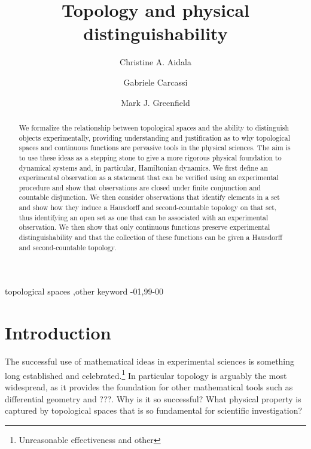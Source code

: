 \documentclass[review]{elsarticle}
\theoremstyle{plain}%
\theoremstyle{definition}
\theoremstyle{remark}
\begin{document}
\begin{frontmatter}

\title{Topology and physical distinguishability}

\author[]{Christine A. Aidala}

\author[]{Gabriele Carcassi}

\author[]{Mark J. Greenfield}

\address{University of Michigan, Ann Arbor, MI 48109, USA}



\begin{abstract}
We formalize the relationship between topological spaces and the ability to distinguish objects experimentally, providing understanding and justification as to why topological spaces and continuous functions are pervasive tools in the physical sciences. The aim is to use these ideas as a stepping stone to give a more rigorous physical foundation to dynamical systems and, in particular, Hamiltonian dynamics.  We first define an experimental observation as a statement that can be verified using an experimental procedure and show that observations are closed under finite conjunction and countable disjunction. We then consider observations that identify elements in a set and show how they induce a Hausdorff and second-countable topology on that set, thus identifying an open set as one that can be associated with an experimental observation. We then show that only continuous functions preserve experimental distinguishability and that the collection of these functions can be given a Hausdorff and second-countable topology. 


\end{abstract}

\begin{keyword}
topological spaces \sep other keyword
-01\sep  99-00
\end{keyword}

\end{frontmatter}

\linenumbers

\section{Introduction}

The successful use of mathematical ideas in experimental sciences is something long established and celebrated.\footnote{Unreasonable effectiveness and other} In particular topology is arguably the most widespread, as it provides the foundation for other mathematical tools such as differential geometry and ???. Why is it so successful? What physical property is captured by topological spaces that is so fundamental for scientific investigation? 
\end{document}
